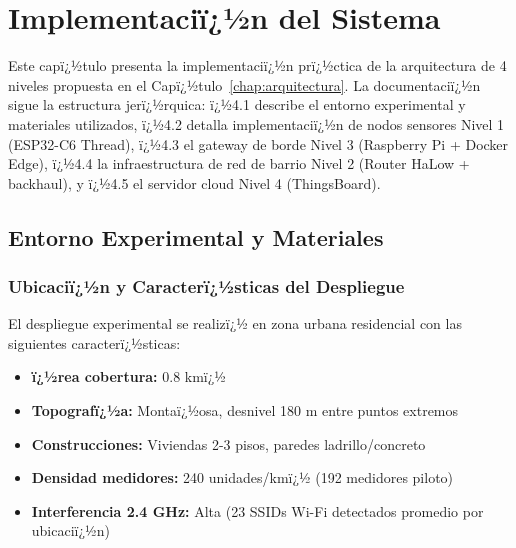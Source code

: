 \chapter{Implementaciï¿½n del Sistema}
\label{chap:implementacion}


Este capï¿½tulo presenta la implementaciï¿½n prï¿½ctica de la arquitectura de 4 niveles propuesta en el Capï¿½tulo~\ref{chap:arquitectura}. La documentaciï¿½n sigue la estructura jerï¿½rquica: ï¿½4.1 describe el entorno experimental y materiales utilizados, ï¿½4.2 detalla implementaciï¿½n de nodos sensores Nivel 1 (ESP32-C6 Thread), ï¿½4.3 el gateway de borde Nivel 3 (Raspberry Pi + Docker Edge), ï¿½4.4 la infraestructura de red de barrio Nivel 2 (Router HaLow + backhaul), y ï¿½4.5 el servidor cloud Nivel 4 (ThingsBoard).\section{Entorno Experimental y Materiales}
\label{sec:impl-entorno}

\subsection{Ubicaciï¿½n y Caracterï¿½sticas del Despliegue}

El despliegue experimental se realizï¿½ en zona urbana residencial con las siguientes caracterï¿½sticas:

\begin{itemize}
    \item \textbf{ï¿½rea cobertura:} 0.8 kmï¿½
    \item \textbf{Topografï¿½a:} Montaï¿½osa, desnivel 180 m entre puntos extremos
    \item \textbf{Construcciones:} Viviendas 2-3 pisos, paredes ladrillo/concreto
    \item \textbf{Densidad medidores:} 240 unidades/kmï¿½ (192 medidores piloto)
    \item \textbf{Interferencia 2.4 GHz:} Alta (23 SSIDs Wi-Fi detectados promedio por ubicaciï¿½n)
\end{itemize}

